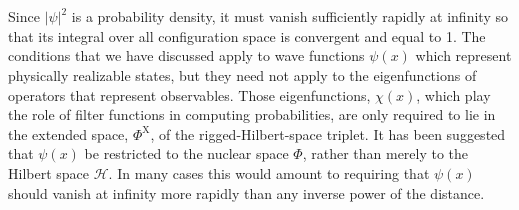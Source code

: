 \\ \\
Since $|\psi|^2$ is a probability density, it must vanish sufficiently rapidly at infinity so that its integral over all configuration space is convergent and equal to 1.
The conditions that we have discussed apply to wave functions $\psi(x)$ which represent physically realizable states, but they need not apply to the eigenfunctions of operators that represent observables. Those eigenfunctions, $\chi(x)$, which play the role of filter functions in computing probabilities, are only required to lie in the extended space, $\Phi^{\mathrm{X}}$, of the rigged-Hilbert-space triplet. It has been suggested that $\psi(x)$ be restricted to the nuclear space $\Phi$, rather than merely to the Hilbert space $\mathcal{H}$. In many cases this would amount to requiring that $\psi(x)$ should vanish at infinity more rapidly than any inverse power of the distance. 

